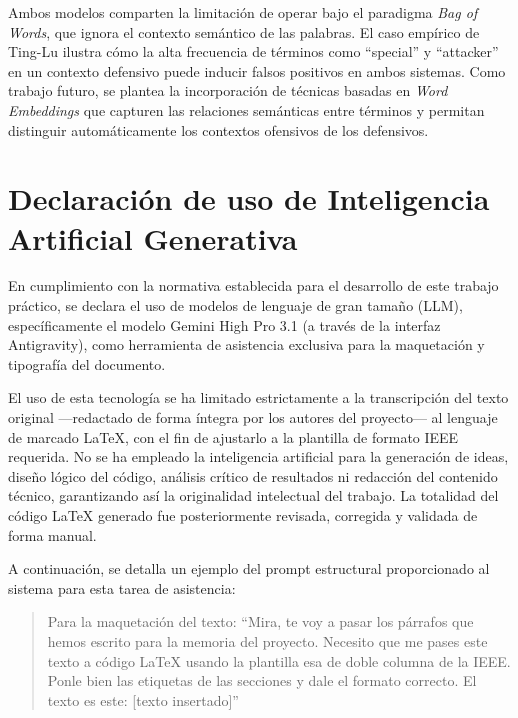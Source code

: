 \documentclass[conference,a4paper]{IEEEtran}
\begin{document}
Ambos modelos comparten la limitación de operar bajo el paradigma \emph{Bag of Words}, que ignora el contexto semántico de las palabras. El caso empírico de Ting-Lu ilustra cómo la alta frecuencia de términos como ``special'' y ``attacker'' en un contexto defensivo puede inducir falsos positivos en ambos sistemas. Como trabajo futuro, se plantea la incorporación de técnicas basadas en \emph{Word Embeddings} que capturen las relaciones semánticas entre términos y permitan distinguir automáticamente los contextos ofensivos de los defensivos.

\section*{Declaración de uso de Inteligencia Artificial Generativa}

En cumplimiento con la normativa establecida para el desarrollo de este trabajo práctico, se declara el uso de modelos de lenguaje de gran tamaño (LLM), específicamente el modelo Gemini High Pro 3.1 (a través de la interfaz Antigravity), como herramienta de asistencia exclusiva para la maquetación y tipografía del documento.

El uso de esta tecnología se ha limitado estrictamente a la transcripción del texto original —redactado de forma íntegra por los autores del proyecto— al lenguaje de marcado LaTeX, con el fin de ajustarlo a la plantilla de formato IEEE requerida. No se ha empleado la inteligencia artificial para la generación de ideas, diseño lógico del código, análisis crítico de resultados ni redacción del contenido técnico, garantizando así la originalidad intelectual del trabajo. La totalidad del código LaTeX generado fue posteriormente revisada, corregida y validada de forma manual.

A continuación, se detalla un ejemplo del prompt estructural proporcionado al sistema para esta tarea de asistencia:

\begin{quote}
Para la maquetación del texto: ``Mira, te voy a pasar los párrafos que hemos escrito para la memoria del proyecto. Necesito que me pases este texto a código LaTeX usando la plantilla esa de doble columna de la IEEE. Ponle bien las etiquetas de las secciones y dale el formato correcto. El texto es este: [texto insertado]''
\end{quote}
\end{document}
